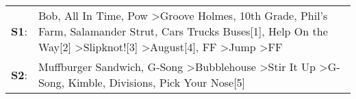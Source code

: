 \begin{supertabular}{p{0.03\textwidth}p{0.92\textwidth}}
 \textbf{S1}:  &  Bob\textsuperscript{}, \enspace All In Time\textsuperscript{}, \enspace Pow\textsuperscript{} \textgreater \enspace Groove Holmes\textsuperscript{}, \enspace 10th Grade\textsuperscript{}, \enspace Phil's Farm\textsuperscript{}, \enspace Salamander Strut\textsuperscript{}, \enspace Cars Trucks Buses[1]\textsuperscript{}, \enspace Help On the Way[2]\textsuperscript{} \textgreater \enspace Slipknot![3]\textsuperscript{} \textgreater \enspace August[4]\textsuperscript{}, \enspace FF\textsuperscript{} \textgreater \enspace Jump\textsuperscript{} \textgreater \enspace FF\textsuperscript{}  \enspace  \\
 \textbf{S2}:  &                                                                                                                                                                                                                                                          Muffburger Sandwich\textsuperscript{}, \enspace G-Song\textsuperscript{} \textgreater \enspace Bubblehouse\textsuperscript{} \textgreater \enspace Stir It Up\textsuperscript{} \textgreater \enspace G-Song\textsuperscript{}, \enspace Kimble\textsuperscript{}, \enspace Divisions\textsuperscript{}, \enspace Pick Your Nose[5]\textsuperscript{}  \enspace  \\
\end{supertabular}
